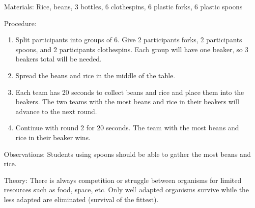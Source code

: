 \begin{multicols}{2}
\begin{description*}
\item[Materials:]{Rice, beans, 3 bottles, 6 clothespins, 6 plastic forks, 6 plastic spoons}
\item[Procedure:]{\hfill
\begin{enumerate}
\item Split participants into groups of 6. Give 2 participants forks, 2 participants spoons, and 2 participants clothespins. Each group will have one beaker, so 3 beakers total will be needed. 
\item Spread the beans and rice in the middle of the table. 
\item Each team has 20 seconds to collect beans and rice and place them into the beakers. The two teams with the most beans and rice in their beakers will advance to the next round. 
\item Continue with round 2 for 20 seconds. The team with the most beans and rice in their beaker wins. 
\end{enumerate} 
}
\item[Observations:]{Students using spoons should be able to gather the most beans and rice.}
\item[Theory:]{There is always competition or struggle between organisms for limited resources such as food, space, etc. Only well adapted organisms survive while the less adapted are eliminated (survival of the fittest).}
\end{description*}

\vfill
\columnbreak
\vfill
\pagebreak



\end{multicols}

